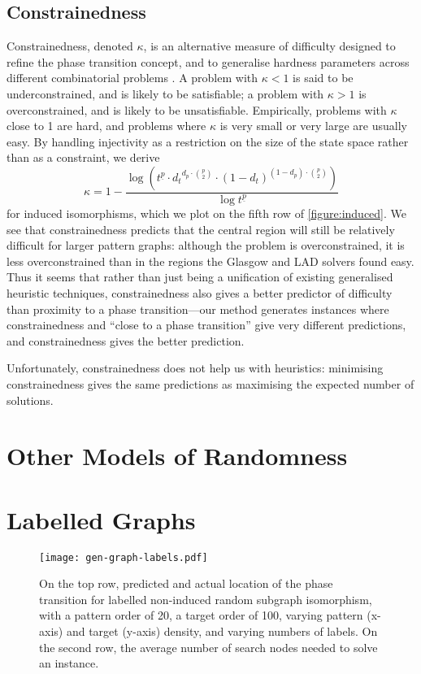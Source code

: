 \documentclass[twoside,11pt]{article}
\newcommand{\citep}[1]{\cite{#1}}
\begin{document}
\subsection{Constrainedness}

Constrainedness, denoted $\kappa$, is an alternative measure of difficulty designed to refine the
phase transition concept, and to generalise hardness parameters across different combinatorial
problems \citep{Gent:1996:Kappa}. A problem with $\kappa < 1$ is said to be underconstrained, and is
likely to be satisfiable; a problem with $\kappa > 1$ is overconstrained, and is likely to be
unsatisfiable. Empirically, problems with $\kappa$ close to 1 are hard, and problems where $\kappa$
is very small or very large are usually easy. By handling injectivity as a restriction on the size
of the state space rather than as a constraint, we derive \[ \kappa = 1 - \frac{\log \left(
t^{\underline{p}} \cdot {d_t}^{d_p \cdot \binom{p}{2}} \cdot {(1 - d_{t})}^{(1 - d_{p}) \cdot
\binom{p}{2}} \right)}{\log t^{\underline{p}}}\] for induced isomorphisms, which we plot on the
fifth row of \cref{figure:induced}. We see that constrainedness predicts that the central region
will still be relatively difficult for larger pattern graphs: although the problem is
overconstrained, it is less overconstrained than in the regions the Glasgow and LAD solvers found
easy.  Thus it seems that rather than just being a unification of existing generalised heuristic
techniques, constrainedness also gives a better predictor of difficulty than proximity to a phase
transition---our method generates instances where constrainedness and ``close to a phase
transition'' give very different predictions, and constrainedness gives the better prediction.

Unfortunately, constrainedness does not help us with heuristics: minimising constrainedness gives
the same predictions as maximising the expected number of solutions.

\section{Other Models of Randomness}\label{section:models}

\section{Labelled Graphs}\label{section:labelled}

\begin{figure}[t]
    \centering\texttt{[image: gen-graph-labels.pdf]}
    \caption{On the top row, predicted and actual location of the phase transition for labelled
    non-induced random subgraph isomorphism, with a pattern order of 20, a target order of 100,
    varying pattern (x-axis) and target (y-axis) density, and varying numbers of labels. On the second
    row, the average number of search nodes needed to solve an instance.}\label{figure:labels}
\end{figure}
\end{document}
